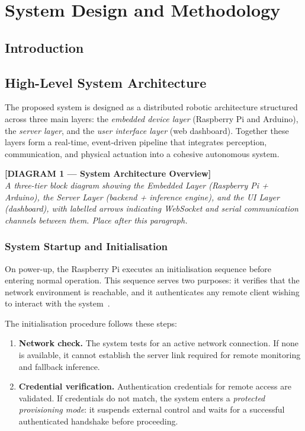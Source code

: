 \chapter{System Design and Methodology}

\section{Introduction}

\section{High-Level System Architecture}
\label{sec:architecture}
 
The proposed system is designed as a distributed robotic architecture
structured across three main layers: the \emph{embedded device layer}
(Raspberry Pi and Arduino), the \emph{server layer}, and the
\emph{user interface layer} (web dashboard). Together these layers
form a real-time, event-driven pipeline that integrates perception,
communication, and physical actuation into a cohesive autonomous
system.
 
\bigskip
\noindent\textbf{[DIAGRAM 1 — System Architecture Overview]}\\
\textit{A three-tier block diagram showing the Embedded Layer
(Raspberry Pi + Arduino), the Server Layer (backend + inference
engine), and the UI Layer (dashboard), with labelled arrows indicating
WebSocket and serial communication channels between them. Place after
this paragraph.}
\bigskip
 
\subsection{System Startup and Initialisation}
 
On power-up, the Raspberry Pi executes an initialisation sequence
before entering normal operation. This sequence serves two purposes:
it verifies that the network environment is reachable, and it
authenticates any remote client wishing to interact with the
system~\cite{heath2002embedded}.
 
The initialisation procedure follows these steps:
 
\begin{enumerate}
    \item \textbf{Network check.} The system tests for an active
          network connection. If none is available, it cannot
          establish the server link required for remote monitoring
          and fallback inference.
 
    \item \textbf{Credential verification.} Authentication credentials
          for remote access are validated. If credentials do not
          match, the system enters a \emph{protected provisioning
          mode}: it suspends external control and waits for a
          successful authenticated handshake before proceeding.
\end{enumerate}
 
